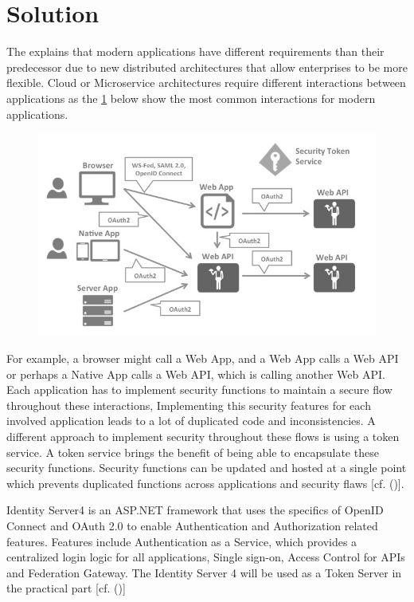 \section{Solution}
The \cite{Sakimura:2014:OpenIDConnect} explains that modern applications have different requirements than their predecessor due to new distributed architectures that allow enterprises to be more flexible. Cloud or Microservice architectures require different interactions between applications as the \ref{fig:architecture-identityserver} below show the most common interactions for modern applications.

\begin{figure}[h]
	\centering
	\includegraphics[width=0.8\linewidth]{images/architecture-identityserver}
	\caption[Architecture IdentityServer4]{}
	\caption{}
	\label{fig:architecture-identityserver}
\end{figure}



For example, a browser might call a Web App, and a Web App calls a Web API or perhaps a Native App calls a Web API, which is calling another Web API. Each application has to implement security functions to maintain a secure flow throughout these interactions, Implementing this security features for each involved application leads to a lot of duplicated code and inconsistencies. A different approach to implement security throughout these flows is using a token service. A token service brings the benefit of being able to encapsulate these security functions. Security functions can be updated and hosted at a single point which prevents duplicated functions across applications and security flaws [cf. (\cite{Sakimura:2014:OpenIDConnect})].

Identity Server4 is an ASP.NET framework that uses the specifics of OpenID Connect and OAuth 2.0 to enable Authentication and Authorization related features. Features include Authentication as a Service, which provides a centralized login logic for all applications, Single sign-on, Access Control for APIs and Federation Gateway. The Identity Server 4 will be used as a Token Server in the practical part [cf. (\cite{Brock:2018:ID4})]

